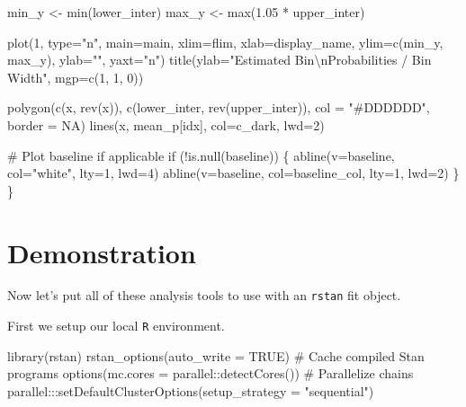 \documentclass[
  letterpaper,
  DIV=11,
  numbers=noendperiod]{scrartcl}
\newenvironment{Shaded}{\begin{snugshade}}{\end{snugshade}}
\newcommand{\AttributeTok}[1]{\textcolor[rgb]{0.40,0.45,0.13}{#1}}
\newcommand{\BuiltInTok}[1]{\textcolor[rgb]{0.00,0.23,0.31}{#1}}
\newcommand{\CharTok}[1]{\textcolor[rgb]{0.13,0.47,0.30}{#1}}
\newcommand{\CommentTok}[1]{\textcolor[rgb]{0.37,0.37,0.37}{#1}}
\newcommand{\ConstantTok}[1]{\textcolor[rgb]{0.56,0.35,0.01}{#1}}
\newcommand{\ControlFlowTok}[1]{\textcolor[rgb]{0.00,0.23,0.31}{#1}}
\newcommand{\DecValTok}[1]{\textcolor[rgb]{0.68,0.00,0.00}{#1}}
\newcommand{\FloatTok}[1]{\textcolor[rgb]{0.68,0.00,0.00}{#1}}
\newcommand{\FunctionTok}[1]{\textcolor[rgb]{0.28,0.35,0.67}{#1}}
\newcommand{\KeywordTok}[1]{\textcolor[rgb]{0.00,0.23,0.31}{#1}}
\newcommand{\NormalTok}[1]{\textcolor[rgb]{0.00,0.23,0.31}{#1}}
\newcommand{\OperatorTok}[1]{\textcolor[rgb]{0.37,0.37,0.37}{#1}}
\newcommand{\SpecialCharTok}[1]{\textcolor[rgb]{0.37,0.37,0.37}{#1}}
\newcommand{\StringTok}[1]{\textcolor[rgb]{0.13,0.47,0.30}{#1}}
\begin{document}
\begin{Shaded}
\begin{Highlighting}[]
\NormalTok{  min\_y }\OperatorTok{\textless{}{-}} \BuiltInTok{min}\NormalTok{(lower\_inter)}
\NormalTok{  max\_y }\OperatorTok{\textless{}{-}} \BuiltInTok{max}\NormalTok{(}\FloatTok{1.05} \OperatorTok{*}\NormalTok{ upper\_inter)}
  
\NormalTok{  plot(}\DecValTok{1}\NormalTok{, }\BuiltInTok{type}\OperatorTok{=}\StringTok{"n"}\NormalTok{, main}\OperatorTok{=}\NormalTok{main,}
\NormalTok{       xlim}\OperatorTok{=}\NormalTok{flim, xlab}\OperatorTok{=}\NormalTok{display\_name,}
\NormalTok{       ylim}\OperatorTok{=}\NormalTok{c(min\_y, max\_y), ylab}\OperatorTok{=}\StringTok{""}\NormalTok{, yaxt}\OperatorTok{=}\StringTok{"n"}\NormalTok{)}
\NormalTok{  title(ylab}\OperatorTok{=}\StringTok{"Estimated Bin}\CharTok{\textbackslash{}n}\StringTok{Probabilities / Bin Width"}\NormalTok{, mgp}\OperatorTok{=}\NormalTok{c(}\DecValTok{1}\NormalTok{, }\DecValTok{1}\NormalTok{, }\DecValTok{0}\NormalTok{))}
  
\NormalTok{  polygon(c(x, rev(x)), c(lower\_inter, rev(upper\_inter)),}
\NormalTok{          col }\OperatorTok{=} \StringTok{"\#DDDDDD"}\NormalTok{, border }\OperatorTok{=}\NormalTok{ NA)}
\NormalTok{  lines(x, mean\_p[idx], col}\OperatorTok{=}\NormalTok{c\_dark, lwd}\OperatorTok{=}\DecValTok{2}\NormalTok{)}
  
  \CommentTok{\# Plot baseline if applicable}
  \ControlFlowTok{if}\NormalTok{ (}\OperatorTok{!}\KeywordTok{is}\NormalTok{.null(baseline)) \{}
\NormalTok{    abline(v}\OperatorTok{=}\NormalTok{baseline, col}\OperatorTok{=}\StringTok{"white"}\NormalTok{, lty}\OperatorTok{=}\DecValTok{1}\NormalTok{, lwd}\OperatorTok{=}\DecValTok{4}\NormalTok{)}
\NormalTok{    abline(v}\OperatorTok{=}\NormalTok{baseline, col}\OperatorTok{=}\NormalTok{baseline\_col, lty}\OperatorTok{=}\DecValTok{1}\NormalTok{, lwd}\OperatorTok{=}\DecValTok{2}\NormalTok{)}
\NormalTok{  \}}
\NormalTok{\}}
\end{Highlighting}
\end{Shaded}

\section{Demonstration}\label{demonstration}

Now let's put all of these analysis tools to use with an \texttt{rstan}
fit object.

First we setup our local \texttt{R} environment.

\begin{Shaded}
\begin{Highlighting}[]
\FunctionTok{library}\NormalTok{(rstan)}
\FunctionTok{rstan\_options}\NormalTok{(}\AttributeTok{auto\_write =} \ConstantTok{TRUE}\NormalTok{)            }\CommentTok{\# Cache compiled Stan programs}
\FunctionTok{options}\NormalTok{(}\AttributeTok{mc.cores =}\NormalTok{ parallel}\SpecialCharTok{::}\FunctionTok{detectCores}\NormalTok{()) }\CommentTok{\# Parallelize chains}
\NormalTok{parallel}\SpecialCharTok{:::}\FunctionTok{setDefaultClusterOptions}\NormalTok{(}\AttributeTok{setup\_strategy =} \StringTok{"sequential"}\NormalTok{)}
\end{Highlighting}
\end{Shaded}
\end{document}
